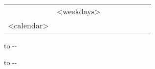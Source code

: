 \begin{tabularx}{\textwidth}{@{}l!{\vrule width 1pt}*{7}{@{}X@{}|}}
& <weekdays> \\ 
<calendar>
\end{tabularx}
\medskip

\parbox{\dimexpr.5\linewidth-.5em}{
    \vbox to \dimexpr\textheight-\pagetotal-\myHBL{}%
}
\hspace{.5em}
\parbox{\dimexpr.5\linewidth-.5em}{
    \vbox to \dimexpr\textheight-\pagetotal-\myHBL{}%
}